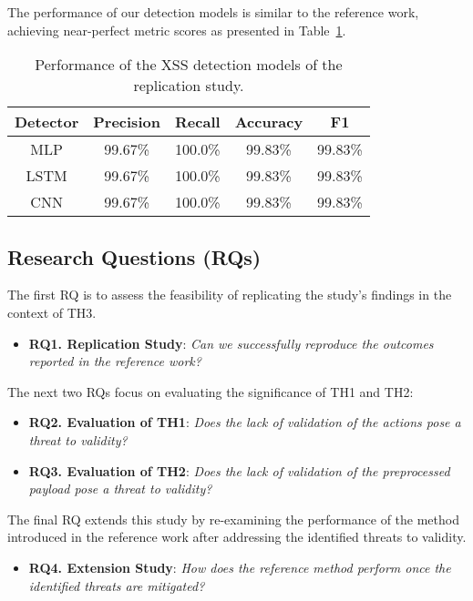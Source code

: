 The performance of our detection models is similar to the reference work, achieving near-perfect metric scores as presented in Table~\ref{tab:detectors}. %

\begin{table}[!h]
\caption{Performance of the XSS detection models of the replication study.} \label{tab:detectors}
\centering
\scalebox {1.0} {
\begin{tabular}{c|cccc}
    \toprule
    Detector & Precision & Recall  & Accuracy & F1      \\
    \midrule
    MLP        & 99.67\%   & 100.0\% & 99.83\%  & 99.83\% \\
    LSTM       & 99.67\%   & 100.0\% & 99.83\%  & 99.83\% \\
    CNN        & 99.67\%   & 100.0\% & 99.83\%  & 99.83\% \\
    \bottomrule
\end{tabular}
}

\end{table}



\subsection{Research Questions (RQs)}

\noindent The first RQ is to assess the feasibility of replicating the study's findings in the context of TH3.
\begin{itemize}
    \item \textbf{RQ1. Replication Study}: \textit{Can we successfully reproduce the outcomes reported in the reference work?}
\end{itemize}

\noindent The next two RQs focus on evaluating the significance of TH1 and TH2:
\begin{itemize}
    \item \textbf{RQ2. Evaluation of TH1}: \textit{Does the lack of validation of the actions pose a threat to validity?}
    \item \textbf{RQ3. Evaluation of TH2}: \textit{Does the lack of validation of the preprocessed payload pose a threat to validity?}
\end{itemize}

\noindent The final RQ extends this study by re-examining the performance of the method introduced in the reference work after addressing the identified threats to validity.
\begin{itemize}
    \item \textbf{RQ4. Extension Study}: \textit{How does the reference method perform once the identified threats are mitigated?}
\end{itemize}



